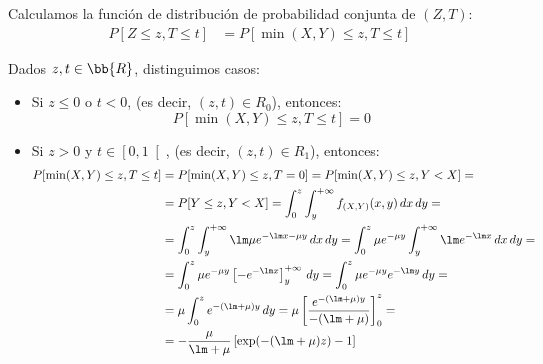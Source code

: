 \begin{ejercicio}
\begin{figure}[H]
    \end{figure}

    Calculamos la función de distribución de probabilidad conjunta de $(Z,T)$:
    \begin{align*}
        P[Z\leq z,T\leq t]&=P[\min(X,Y)\leq z,T\leq t]
    \end{align*}

    Dados $z,t\in \bb{R}$, distinguimos casos:
    \begin{itemize}
        \item Si $z\leq 0$ o $t<0$, (es decir, $(z,t)\in R_0$), entonces:
        \begin{equation*}
            P[\min(X,Y)\leq z,T\leq t]=0
        \end{equation*}

        \item Si $z>0$ y $t\in \left[0,1\right[$, (es decir, $(z,t)\in R_1$), entonces:
        \begin{align*}
            P[\min(X,Y)\leq z,T\leq t]&=P[\min(X,Y)\leq z,T=0]
            = P[\min(X,Y)\leq z,Y<X]
            =\\&= P[Y\leq z,Y<X]
            = \int_{0}^{z}\int_{y}^{+\infty} f_{(X,Y)}(x,y) \, dx \, dy
            =\\&= \int_{0}^{z}\int_{y}^{+\infty} \lm\mu e^{-\lm x-\mu y} \, dx \, dy
            = \int_{0}^{z}\mu e^{-\mu y}\int_{y}^{+\infty} \lm e^{-\lm x} \, dx \, dy
            =\\&= \int_{0}^{z}\mu e^{-\mu y}\left[-e^{-\lm x}\right]_{y}^{+\infty} \, dy
            = \int_{0}^{z}\mu e^{-\mu y}e^{-\lm y} \, dy
            =\\&= \mu\int_{0}^{z} e^{-(\lm+\mu)y} \, dy
            = \mu\left[\dfrac{e^{-(\lm+\mu)y}}{-(\lm+\mu)}\right]_{0}^{z}
            =\\&= -\dfrac{\mu}{\lm+\mu} \left[\exp(-(\lm+\mu)z)-1\right]
        \end{align*}


\end{itemize}
\end{ejercicio}
